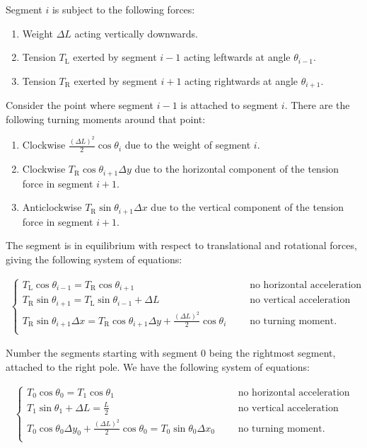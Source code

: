 \documentclass[12pt]{article}
\newcommand{\Tl}{T_{\text{L}}}
\newcommand{\Tr}{T_{\text{R}}}
\begin{document}
Segment $i$ is subject to the following forces:
\begin{enumerate}
\item Weight $\Delta L$ acting vertically downwards.
\item Tension $\Tl$ exerted by segment $i-1$ acting leftwards at angle $\theta_{i-1}$.
\item Tension $\Tr$ exerted by segment $i+1$ acting rightwards at angle $\theta_{i+1}$.
\end{enumerate}
Consider the point where segment $i-1$ is attached to segment $i$. There are the following turning
moments around that point:
\begin{enumerate}
\item Clockwise $\frac{(\Delta L)^2}{2}\cos\theta_i$ due to the weight of segment $i$.
\item Clockwise $\Tr\cos\theta_{i+1}\Delta y$ due to the horizontal component of the tension force
  in segment $i+1$.
\item Anticlockwise $\Tr\sin\theta_{i+1}\Delta x$ due to the vertical component of the tension
  force in segment $i+1$.
\end{enumerate}

The segment is in equilibrium with respect to translational and rotational forces, giving the
following system of equations:

\begin{align*}
  \begin{cases}
    \Tl\cos\theta_{i-1} = \Tr\cos\theta_{i+1} ~~~~~~~&\text{no horizontal acceleration}\\
    \Tr\sin\theta_{i+1} = \Tl\sin\theta_{i-1} + \Delta L ~~~~~~~&\text{no vertical acceleration}\\
    \Tr\sin\theta_{i+1}\Delta x = \Tr\cos\theta_{i+1}\Delta y + \frac{(\Delta L)^2}{2}\cos\theta_i ~~~~~~~&\text{no turning moment.}\\
  \end{cases}
\end{align*}

\newpage

Number the segments starting with segment 0 being the rightmost segment, attached to the right
pole. We have the following system of equations:

\begin{align*}
  \begin{cases}
    T_0\cos\theta_0 = T_1\cos\theta_1                               ~~~~~~~&\text{no horizontal acceleration}\\
    T_1\sin\theta_1 + \Delta L = \frac{L}{2}                        ~~~~~~~&\text{no vertical acceleration}\\
    T_0\cos\theta_0\Delta y_0 +
    \frac{(\Delta L)^2}{2} \cos\theta_0 = T_0\sin\theta_0 \Delta x_0 ~~~~~~~&\text{no turning moment.}\\
  \end{cases}
\end{align*}
\end{document}
